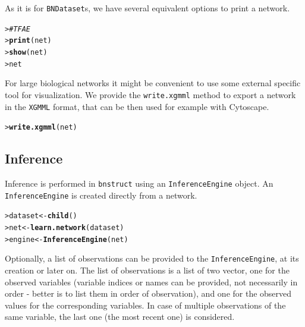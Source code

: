 \documentclass{article}\usepackage[]{graphicx}\usepackage[]{color}
\makeatletter
\newcommand{\hlcom}[1]{\textcolor[rgb]{0.678,0.584,0.686}{\textit{#1}}}%
\newcommand{\hlstd}[1]{\textcolor[rgb]{0.345,0.345,0.345}{#1}}%
\newcommand{\hlkwb}[1]{\textcolor[rgb]{0.69,0.353,0.396}{#1}}%
\newcommand{\hlkwd}[1]{\textcolor[rgb]{0.737,0.353,0.396}{\textbf{#1}}}%
\newenvironment{kframe}{%
 \def\at@end@of@kframe{}%
 \ifinner\ifhmode%
  \def\at@end@of@kframe{\end{minipage}}%
  \begin{minipage}{\columnwidth}%
 \fi\fi%
 \def\FrameCommand##1{\hskip\@totalleftmargin \hskip-\fboxsep
 \colorbox{shadecolor}{##1}\hskip-\fboxsep
     \hskip-\linewidth \hskip-\@totalleftmargin \hskip\columnwidth}%
 \MakeFramed {\advance\hsize-\width
   \@totalleftmargin\z@ \linewidth\hsize
   \@setminipage}}%
 {\par\unskip\endMakeFramed%
 \at@end@of@kframe}
\newenvironment{knitrout}{}{} %
\newcommand{\Robject}[1]{{\texttt{#1}}}
\newcommand{\Rpackage}[1]{{\texttt{#1}}}
\newcommand{\Rfunarg}[1]{{\texttt{#1}}}
\makeatother
\begin{document}
As it is for \Robject{BNDataset}s, we have several equivalent options to print a network.
\begin{knitrout}
\color{fgcolor}\begin{kframe}
\begin{alltt}
\hlstd{> }\hlcom{# TFAE}
\hlstd{> }\hlkwd{print}\hlstd{(net)}
\hlstd{> }\hlkwd{show}\hlstd{(net)}
\hlstd{> }\hlstd{net}
\end{alltt}
\end{kframe}
\end{knitrout}

For large biological networks it might be convenient to use some external specific tool for visualization.
We provide the \Rfunarg{write.xgmml} method to export a network in the \texttt{XGMML} format, that can be
then used for example with Cytoscape.
\begin{knitrout}
\color{fgcolor}\begin{kframe}
\begin{alltt}
\hlstd{> }\hlkwd{write.xgmml}\hlstd{(net)}
\end{alltt}
\end{kframe}
\end{knitrout}


\subsection{Inference}\label{sec:infengine}
Inference is performed in \Rpackage{bnstruct} using an \Robject{InferenceEngine} object. An \Robject{InferenceEngine}
is created directly from a network.
\begin{knitrout}
\color{fgcolor}\begin{kframe}
\begin{alltt}
\hlstd{> }\hlstd{dataset} \hlkwb{<-} \hlkwd{child}\hlstd{()}
\hlstd{> }\hlstd{net}     \hlkwb{<-} \hlkwd{learn.network}\hlstd{(dataset)}
\hlstd{> }\hlstd{engine}  \hlkwb{<-} \hlkwd{InferenceEngine}\hlstd{(net)}
\end{alltt}
\end{kframe}
\end{knitrout}

Optionally, a list of observations can be provided to the \Robject{InferenceEngine}, at its creation or later on.
The list of observations is a list of two vector, one for the observed variables
(variable indices or names can be provided, not necessarily in order - better is to list them in order of observation),
and one for the observed values for the corresponding variables. In case of multiple observations of the same variable, the last one (the most recent one) is considered.
\end{document}
